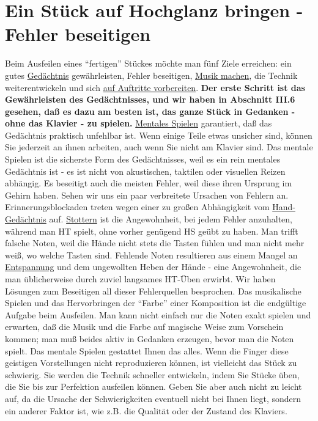 
\section{Ein Stück auf Hochglanz bringen - Fehler beseitigen}
\label{c1iii9}

Beim Ausfeilen eines \enquote{fertigen} Stückes möchte man fünf Ziele erreichen: ein gutes \hyperref[c1iii6]{Gedächtnis} gewährleisten, Fehler beseitigen, \hyperref[c1iii14d]{Musik machen}, die Technik weiterentwickeln und sich \hyperref[c1iii14]{auf Auftritte vorbereiten}.
\textbf{Der erste Schritt ist das Gewährleisten des Gedächtnisses, und wir haben in Abschnitt III.6 gesehen, daß es dazu am besten ist, das ganze Stück in Gedanken - ohne das Klavier - zu spielen.}
\hyperref[c1ii12]{Mentales Spielen} garantiert, daß das Gedächtnis praktisch unfehlbar ist.
Wenn einige Teile etwas unsicher sind, können Sie jederzeit an ihnen arbeiten, auch wenn Sie nicht am Klavier sind.
Das mentale Spielen ist die sicherste Form des Gedächtnisses, weil es ein rein mentales Gedächtnis ist - es ist nicht von akustischen, taktilen oder visuellen Reizen abhängig.
Es beseitigt auch die meisten Fehler, weil diese ihren Ursprung im Gehirn haben.
Sehen wir uns ein paar verbreitete Ursachen von Fehlern an.
Erinnerungsblockaden treten wegen einer zu großen Abhängigkeit vom \hyperref[c1iii6hand]{Hand-Gedächtnis} auf.
\hyperref[c1ii22]{Stottern} ist die Angewohnheit, bei jedem Fehler anzuhalten, während man HT spielt, ohne vorher genügend HS geübt zu haben.
Man trifft falsche Noten, weil die Hände nicht stets die Tasten fühlen und man nicht mehr weiß, wo welche Tasten sind.
Fehlende Noten resultieren aus einem Mangel an \hyperref[c1ii14]{Entspannung} und dem ungewollten Heben der Hände - eine Angewohnheit, die man üblicherweise durch zuviel langsames HT-Üben erwirbt.
Wir haben Lösungen  zum Beseitigen all dieser Fehlerquellen besprochen.
Das musikalische Spielen und das Hervorbringen der \enquote{Farbe} einer Komposition ist die endgültige Aufgabe beim Ausfeilen.
Man kann nicht einfach nur die Noten exakt spielen und erwarten, daß die Musik und die Farbe auf magische Weise zum Vorschein kommen; man muß beides aktiv in Gedanken erzeugen, bevor man die Noten spielt.
Das mentale Spielen gestattet Ihnen das alles.
Wenn die Finger diese geistigen Vorstellungen nicht reproduzieren können, ist vielleicht das Stück zu schwierig.
Sie werden die Technik schneller entwickeln, indem Sie Stücke üben, die Sie bis zur Perfektion ausfeilen können.
Geben Sie aber auch nicht zu leicht auf, da die Ursache der Schwierigkeiten eventuell nicht bei Ihnen liegt, sondern ein anderer Faktor ist, wie z.B. die Qualität oder der Zustand des Klaviers.

